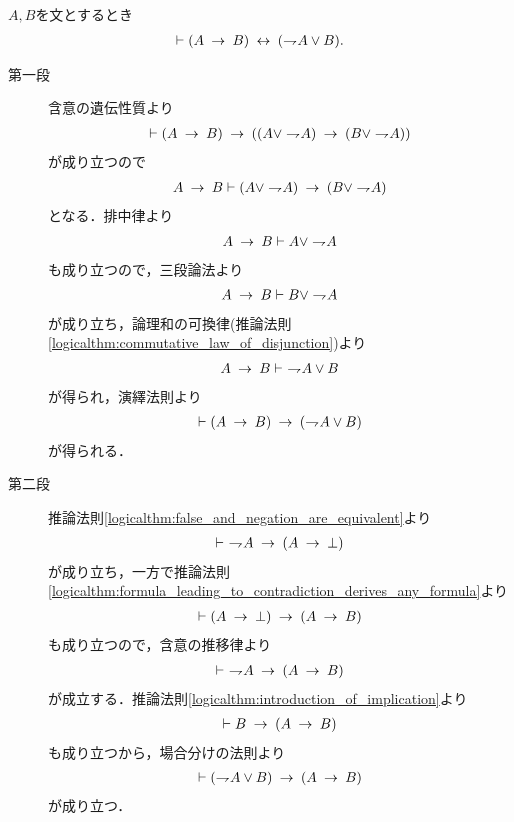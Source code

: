 	\begin{screen}
		\begin{logicalthm}[含意は否定と論理和で表せる]\label{logicalthm:rule_of_inference_3}
			$A,B$を文とするとき
			\begin{align}
				\vdash (A \rarrow B) \lrarrow (\negation A \vee B).
			\end{align}
		\end{logicalthm}
	\end{screen}
	
	\begin{prf}\mbox{}
		\begin{description}
			\item[第一段]
				含意の遺伝性質より
				\begin{align}
					\vdash (A \rarrow B) \rarrow 
					((A \vee \negation A) \rarrow (B \vee \negation A))
				\end{align}
				が成り立つので
				\begin{align}
					A \rarrow B \vdash (A \vee \negation A) \rarrow (B \vee \negation A)
				\end{align}
				となる．排中律より
				\begin{align}
					A \rarrow B \vdash A \vee \negation A
				\end{align}
				も成り立つので，三段論法より
				\begin{align}
					A \rarrow B \vdash B \vee \negation A
				\end{align}
				が成り立ち，論理和の可換律(推論法則\ref{logicalthm:commutative_law_of_disjunction})より
				\begin{align}
					A \rarrow B \vdash\ \negation A \vee B
				\end{align}
				が得られ，演繹法則より
				\begin{align}
					\vdash (A \rarrow B) \rarrow (\negation A \vee B)
				\end{align}
				が得られる．
				
			\item[第二段]
				推論法則\ref{logicalthm:false_and_negation_are_equivalent}より
				\begin{align}
					\vdash\ \negation A \rarrow (A \rarrow \bot)
				\end{align}
				が成り立ち，一方で推論法則\ref{logicalthm:formula_leading_to_contradiction_derives_any_formula}より
				\begin{align}
					\vdash (A \rarrow \bot) \rarrow (A \rarrow B)
				\end{align}
				も成り立つので，含意の推移律より
				\begin{align}
					\vdash\ \negation A \rarrow (A \rarrow B)
				\end{align}
				が成立する．推論法則\ref{logicalthm:introduction_of_implication}より
				\begin{align}
					\vdash B \rarrow (A \rarrow B)
				\end{align}
				も成り立つから，場合分けの法則より
				\begin{align}
					\vdash (\negation A \vee B) \rarrow (A \rarrow B)
				\end{align}
				が成り立つ．
				\QED
		\end{description}
	\end{prf}
	
